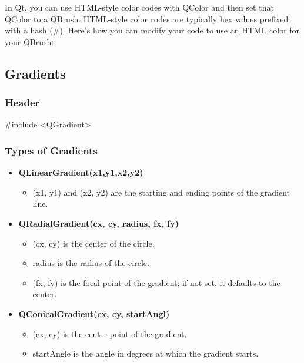\documentclass{report}
\begin{document}
    \pagebreak
    \bigbreak \noindent 
    \begin{concept}
        In Qt, you can use HTML-style color codes with QColor and then set that QColor to a QBrush. HTML-style color codes are typically hex values prefixed with a hash (\#). Here's how you can modify your code to use an HTML color for your QBrush:
    \end{concept}
    \bigbreak \noindent 

    \bigbreak \noindent 
    \subsection{Gradients}
    \subsubsection{Header}
    \bigbreak \noindent 
    \begin{cppcode}
    #include <QGradient>
    \end{cppcode}

    \bigbreak \noindent 
    \subsubsection{Types of Gradients}
    \begin{itemize}
        \item \textbf{QLinearGradient(x1,y1,x2,y2)}
            \begin{itemize}
                \item (x1, y1) and (x2, y2) are the starting and ending points of the gradient line.
            \end{itemize}
        \item \textbf{QRadialGradient(cx, cy, radius, fx, fy)}
            \begin{itemize}
                \item (cx, cy) is the center of the circle.
                \item radius is the radius of the circle.
                \item (fx, fy) is the focal point of the gradient; if not set, it defaults to the center.
            \end{itemize}
        \item \textbf{QConicalGradient(cx, cy, startAngl)}
            \begin{itemize}
                \item (cx, cy) is the center point of the gradient.
                \item startAngle is the angle in degrees at which the gradient starts.
            \end{itemize}
    \end{itemize}
\end{document}
